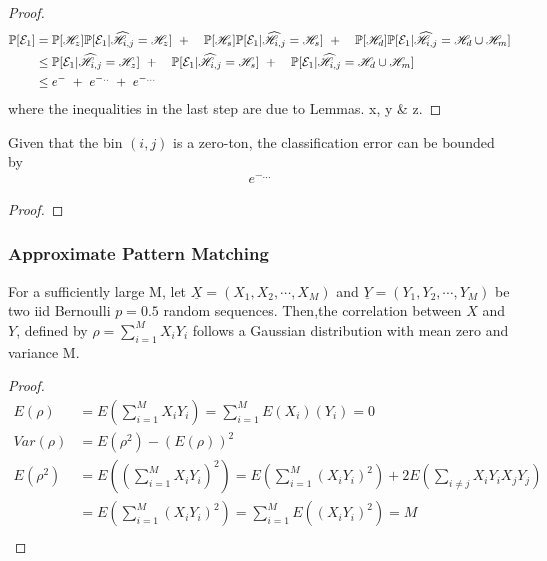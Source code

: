\begin{proof}
\begin{align*}
\mathbb{P}[\mathcal{E}_1]&=\mathbb{P}[\mathscr{H}_z]\mathbb{P}[\mathcal{E}_1|\widehat{\mathscr{H}}_{i,j}=\mathscr{H}_z]~+
						\quad \mathbb{P}[\mathscr{H}_s]\mathbb{P}[\mathcal{E}_1|\widehat{\mathscr{H}}_{i,j}=\mathscr{H}_s]~+
						\quad\mathbb{P}[\mathscr{H}_d]\mathbb{P}[\mathcal{E}_1|\widehat{\mathscr{H}}_{i,j}=\mathscr{H}_d \cup \mathscr{H}_m]\\
				&\leq \mathbb{P}[\mathcal{E}_1|\widehat{\mathscr{H}}_{i,j}=\mathscr{H}_z]~+
						\quad \mathbb{P}[\mathcal{E}_1|\widehat{\mathscr{H}}_{i,j}=\mathscr{H}_s]~+
						\quad \mathbb{P}[\mathcal{E}_1|\widehat{\mathscr{H}}_{i,j}=\mathscr{H}_d \cup \mathscr{H}_m]\\
    			&\leq  e^{-} ~+~e^{-..}~+~ e^{-...}						
						\end{align*}
						where the inequalities in the last step are due to Lemmas.  x, y \& z.
\end{proof}

\begin{lemma}
Given that the bin $(i,j)$ is a zero-ton, the classification error can be bounded by
\begin{align*}
e^{-...}
\end{align*}
\end{lemma}
\begin{proof}

\end{proof}

\begin{lemma}
\end{lemma}

\begin{lemma}
\end{lemma}

\subsubsection*{Approximate Pattern Matching}




\begin{lemma} \label{lem1}For a sufficiently large M, let $\underline{X}= (X_1, X_2, \cdots, X_M)$ and $\underline{Y}= (Y_1, Y_2, \cdots, Y_M)$ be two iid Bernoulli $p=0.5$ random sequences. Then,the correlation between $X$ and $Y$, defined by $\rho = \sum_{i=1}^{M} X_iY_i$ follows a Gaussian distribution with mean zero and variance M.
\end{lemma}

\begin{proof}
	\[
	\begin{array}{ll}
	E(\rho) &= E (\sum_{i=1}^{M} X_iY_i) =  \sum_{i=1}^{M} E (X_i)(Y_i) = 0  \\
	Var(\rho) &= E(\rho^2)-(E(\rho))^2 \\
	E(\rho^2) &= E ((\sum_{i=1}^{M} X_iY_i)^2) = E(\sum_{i=1}^{M} (X_iY_i)^2) + 2E(\sum_{i \neq j}X_iY_iX_jY_j) \\
	&= E(\sum_{i=1}^{M} (X_iY_i)^2) = \sum_{i=1}^{M} E( (X_iY_i)^2) = M \\
	\end{array}
	\]
\end{proof}


